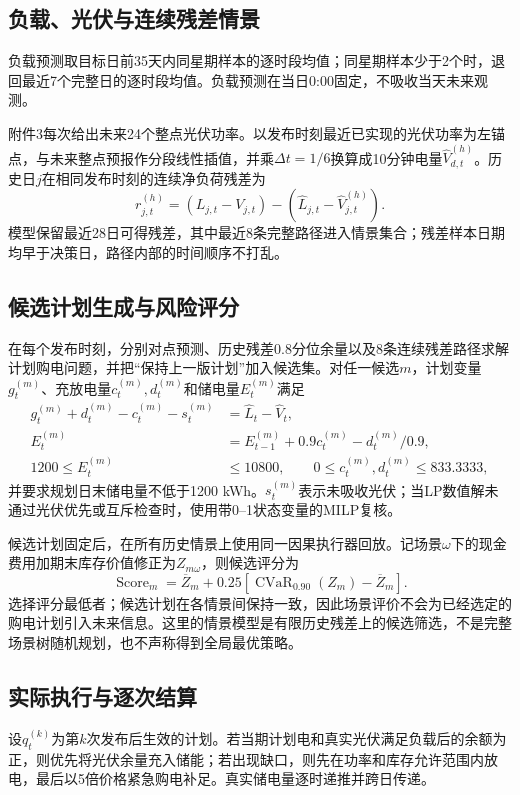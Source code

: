 \documentclass[UTF8,a4paper,12pt]{ctexart}
\begin{document}
\subsection{负载、光伏与连续残差情景}
负载预测取目标日前35天内同星期样本的逐时段均值；同星期样本少于2个时，退回最近7个完整日的逐时段均值。负载预测在当日0:00固定，不吸收当天未来观测。

附件3每次给出未来24个整点光伏功率。以发布时刻最近已实现的光伏功率为左锚点，与未来整点预报作分段线性插值，并乘$\Delta t=1/6$换算成10分钟电量$\widehat V_{d,t}^{(h)}$。历史日$j$在相同发布时刻的连续净负荷残差为
\begin{equation}
 r_{j,t}^{(h)}=(L_{j,t}-V_{j,t})-(\widehat L_{j,t}-\widehat V_{j,t}^{(h)}).
\end{equation}
模型保留最近28日可得残差，其中最近8条完整路径进入情景集合；残差样本日期均早于决策日，路径内部的时间顺序不打乱。

\subsection{候选计划生成与风险评分}
在每个发布时刻，分别对点预测、历史残差0.8分位余量以及8条连续残差路径求解计划购电问题，并把“保持上一版计划”加入候选集。对任一候选$m$，计划变量$g_t^{(m)}$、充放电量$c_t^{(m)},d_t^{(m)}$和储电量$E_t^{(m)}$满足
\begin{align}
 g_t^{(m)}+d_t^{(m)}-c_t^{(m)}-s_t^{(m)}&=\widehat L_t-\widehat V_t,\\
 E_t^{(m)}&=E_{t-1}^{(m)}+0.9c_t^{(m)}-d_t^{(m)}/0.9,\\
 1200\le E_t^{(m)}&\le10800,\qquad
 0\le c_t^{(m)},d_t^{(m)}\le833.3333,
\end{align}
并要求规划日末储电量不低于1200 kWh。$s_t^{(m)}$表示未吸收光伏；当LP数值解未通过光伏优先或互斥检查时，使用带0--1状态变量的MILP复核。

候选计划固定后，在所有历史情景上使用同一因果执行器回放。记场景$\omega$下的现金费用加期末库存价值修正为$Z_{m\omega}$，则候选评分为
\begin{equation}
 \operatorname{Score}_m=\overline Z_m+0.25\left[
 \operatorname{CVaR}_{0.90}(Z_m)-\overline Z_m\right].
\end{equation}
选择评分最低者；候选计划在各情景间保持一致，因此场景评价不会为已经选定的购电计划引入未来信息。这里的情景模型是有限历史残差上的候选筛选，不是完整场景树随机规划，也不声称得到全局最优策略。

\subsection{实际执行与逐次结算}
设$q_t^{(k)}$为第$k$次发布后生效的计划。若当期计划电和真实光伏满足负载后的余额为正，则优先将光伏余量充入储能；若出现缺口，则先在功率和库存允许范围内放电，最后以5倍价格紧急购电补足。真实储电量逐时递推并跨日传递。
\end{document}
